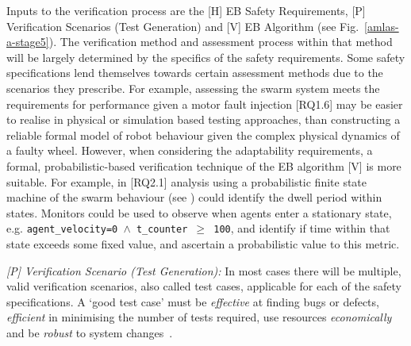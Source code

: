 \documentclass[runningheads]{llncs}
\begin{document}
Inputs to the verification process are the [H] EB Safety Requirements, [P] Verification Scenarios (Test Generation) and [V] EB Algorithm (see Fig.~\ref{amlas-a-stage5}). 
%
The verification method and assessment process within that method will be largely determined by the specifics of the safety requirements. Some safety specifications lend themselves towards certain assessment methods due to the scenarios they prescribe.
%
For example, assessing the swarm system meets the requirements for performance given a motor fault injection [RQ1.6] may be easier to realise in physical or simulation based testing approaches, than constructing a reliable formal model of robot behaviour given the complex physical dynamics of a faulty wheel. 
%
However, when considering the adaptability requirements, a formal, probabilistic-based verification technique of the EB algorithm [V] is more suitable. For example, in [RQ2.1] analysis using a probabilistic finite state machine of the swarm behaviour (see \cite{Hoffmann2016,Calinescu2018}) could identify the dwell period within states. Monitors could be used to observe when agents enter a stationary state, e.g. \texttt{agent\_velocity=0 $\land $  t\_counter  $\ge$ 100}, and identify if time within that state exceeds some fixed value, and ascertain a probabilistic value to this metric.
%

\emph{[P] Verification Scenario (Test Generation):} In most cases there will be multiple, valid verification scenarios, also called test cases, applicable for each of the safety specifications. A `good test case' must be \emph{effective} at finding bugs or defects, \emph{efficient} in minimising the number of tests required, use resources \emph{economically} and be \emph{robust} to system changes~\cite{Fewster1999}. 

\end{document}
